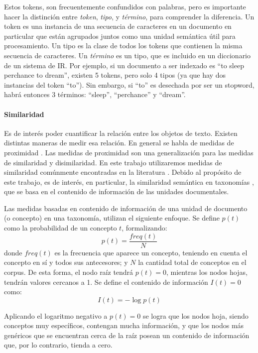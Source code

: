 Estos tokens, son frecuentemente confundidos con palabras, pero es importante hacer la distinción entre \textit{token}, \textit{tipo}, y \textit{término}, para comprender la diferencia. Un token es una instancia de una secuencia de caracteres en un documento en particular que están agrupados juntos como una unidad semántica útil para procesamiento. Un tipo es la clase de todos los tokens que contienen la misma secuencia de caracteres. Un \textit{término} es un tipo, que es incluido en un diccionario de un sistema de IR. Por ejemplo, si un documento a ser indexado es “to sleep perchance to dream”, existen 5 tokens, pero solo 4 tipos (ya que hay dos instancias del token “to”). Sin embargo, si “to” es desechada por ser un stopword, habrá entonces 3 términos: “sleep”, “perchance” y “dream”.

\paragraph{Similaridad}\label{paragraph:similaridad}
Es de interés poder cuantificar la relación entre los objetos de texto. Existen distintas maneras de medir esa relación. En general se habla de medidas de proximidad \citep{xu2008clustering}. Las medidas de proximidad son una generalización para las medidas de similaridad y disimilaridad. En este trabajo utilizaremos medidas de similaridad comúnmente encontradas en la literatura \citep{resnik1995using, lin1998information, gomaa2013survey, harispe2015semantic}. Debido al propósito de este trabajo, es de interés, en particular, la similaridad semántica en taxonomías \citep{resnik1995using}, que se basa en el contenido de información de las unidades documentales.

\bigskip Las medidas basadas en contenido de información de una unidad de documento (o concepto) en una taxonomía, utilizan el siguiente enfoque. Se define \(p(t)\) como la probabilidad de un concepto \(t\), formalizando:
\[p(t)=\frac{freq(t)}{N}\]
donde \(freq(t)\) es la frecuencia que aparece un concepto, teniendo en cuenta el concepto en sí y todos sus antecesores; y \(N\) la cantidad total de conceptos en el corpus. De esta forma, el nodo raíz tendrá \(p(t) = 0\), mientras los nodos hojas, tendrán valores cercanos a 1. Se define el contenido de información \(I(t) = 0\) como:
\[I(t)=-\log p(t)\]

Aplicando el logaritmo negativo a \(p(t) = 0\) se logra que los nodos hoja, siendo conceptos muy específicos, contengan mucha información, y que los nodos más genéricos que se encuentran cerca de la raíz posean un contenido de información que, por lo contrario, tienda a cero.

